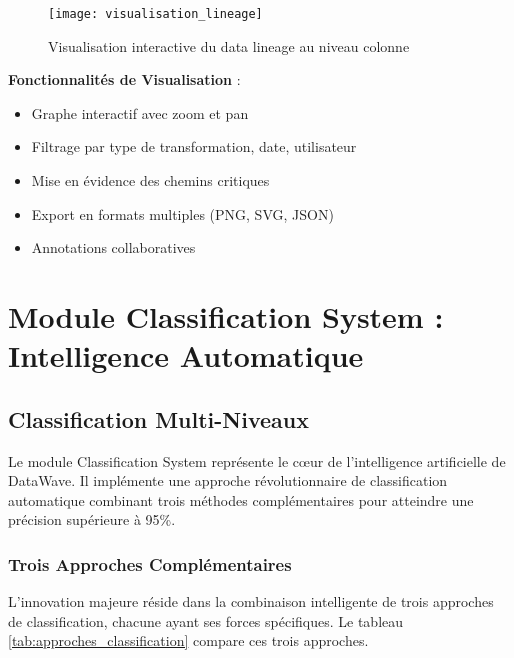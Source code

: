 \begin{figure}[htpb]
\centering
\texttt{[image: visualisation\_lineage]}
\caption{Visualisation interactive du data lineage au niveau colonne}
\label{fig:visualisation_lineage}
\end{figure}

\textbf{Fonctionnalités de Visualisation} :
\begin{itemize}
    \item Graphe interactif avec zoom et pan
    \item Filtrage par type de transformation, date, utilisateur
    \item Mise en évidence des chemins critiques
    \item Export en formats multiples (PNG, SVG, JSON)
    \item Annotations collaboratives
\end{itemize}




\section{Module Classification System : Intelligence Automatique}

\subsection{Classification Multi-Niveaux}

Le module Classification System représente le cœur de l'intelligence artificielle de DataWave. Il implémente une approche révolutionnaire de classification automatique combinant trois méthodes complémentaires pour atteindre une précision supérieure à 95\%.

\subsubsection{Trois Approches Complémentaires}

L'innovation majeure réside dans la combinaison intelligente de trois approches de classification, chacune ayant ses forces spécifiques. Le tableau \ref{tab:approches_classification} compare ces trois approches.

